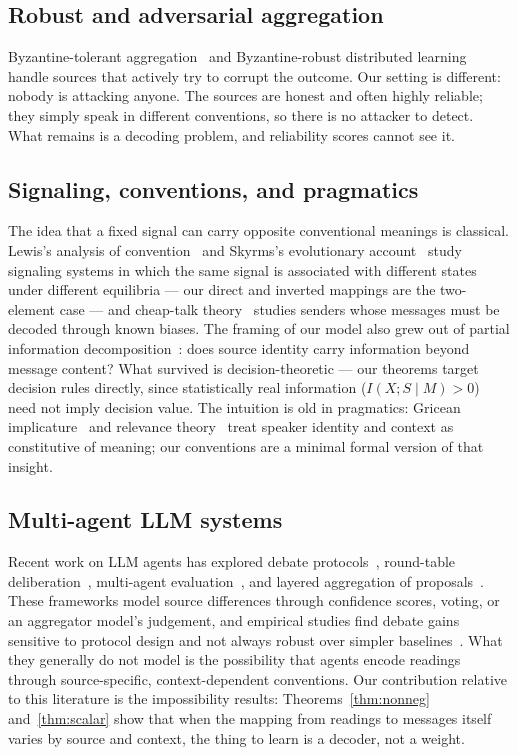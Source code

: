 \subsection{Robust and adversarial aggregation}

Byzantine-tolerant aggregation~\cite{blanchard2017} and
Byzantine-robust distributed learning~\cite{yin2018} handle sources that
actively try to corrupt the outcome. Our setting is different: nobody is
attacking anyone. The sources are honest and often highly reliable; they
simply speak in different conventions, so there is no attacker to detect.
What remains is a decoding problem, and reliability scores cannot see it.

\subsection{Signaling, conventions, and pragmatics}

The idea that a fixed signal can carry opposite conventional meanings is
classical. Lewis's analysis of convention~\cite{lewis1969} and Skyrms's
evolutionary account~\cite{skyrms1996} study signaling systems in which
the same signal is associated with different states under different
equilibria --- our direct and inverted mappings are the two-element
case --- and cheap-talk theory~\cite{crawford1982} studies senders whose
messages must be decoded through known biases. The framing of our model
also grew out of partial information
decomposition~\cite{williams2010,bertschinger2014}: does source identity
carry information beyond message content? What survived is
decision-theoretic --- our theorems target decision rules directly,
since statistically real information ($I(X;S\mid M) > 0$) need not imply
decision value. The intuition is old in pragmatics: Gricean
implicature~\cite{grice1975} and relevance theory~\cite{sperber1995}
treat speaker identity and context as constitutive of meaning; our
conventions are a minimal formal version of that insight.

\subsection{Multi-agent LLM systems}

Recent work on LLM agents has explored debate protocols~\cite{du2024debate,
liang2024debate}, round-table deliberation~\cite{chen2024reconcile},
multi-agent evaluation~\cite{chan2024chateval}, and layered aggregation of
proposals~\cite{wang2024moa}. These frameworks model source differences
through confidence scores, voting, or an aggregator model's judgement, and
empirical studies find debate gains sensitive to protocol design and not
always robust over simpler baselines~\cite{smit2024mad}. What they
generally do not model is the possibility that agents encode readings
through source-specific, context-dependent conventions. Our contribution
relative to this literature is the impossibility results:
Theorems~\ref{thm:nonneg} and~\ref{thm:scalar} show that when the mapping
from readings to messages itself varies by source and context, the thing
to learn is a decoder, not a weight.
